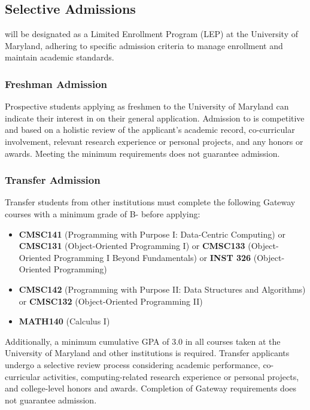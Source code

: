 \subsection{Selective Admissions}

\name{} will be designated as a Limited Enrollment Program (LEP) at the University of Maryland, adhering to specific admission criteria to manage enrollment and maintain academic standards.

\subsubsection*{Freshman Admission}
Prospective students applying as freshmen to the University of Maryland can indicate their interest in \name{} on their general application. Admission to \short{} is competitive and based on a holistic review of the applicant's academic record, co-curricular involvement, relevant research experience or personal projects, and any honors or awards. Meeting the minimum requirements does not guarantee admission.

\subsubsection*{Transfer Admission}
Transfer students from other institutions must complete the following Gateway courses with a minimum grade of B- before applying:
\begin{itemize}
    \item \textbf{CMSC141} (Programming with Purpose I: Data-Centric Computing) or \textbf{CMSC131} (Object-Oriented Programming I) or \textbf{CMSC133} (Object-Oriented Programming I Beyond Fundamentals) or \textbf{INST 326} (Object-Oriented Programming)
    \item \textbf{CMSC142} (Programming with Purpose II: Data Structures and Algorithms) or \textbf{CMSC132} (Object-Oriented Programming II)
    \item \textbf{MATH140} (Calculus I) 
\end{itemize}

Additionally, a minimum cumulative GPA of 3.0 in all courses taken at the University of Maryland and other institutions is required. Transfer applicants undergo a selective review process considering academic performance, co-curricular activities, computing-related research experience or personal projects, and college-level honors and awards. Completion of Gateway requirements does not guarantee admission.

